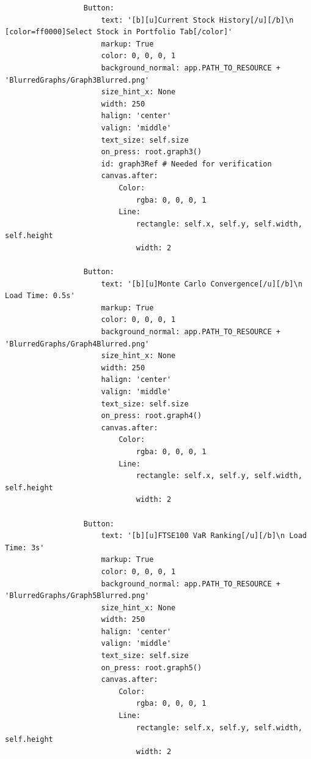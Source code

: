 \documentclass{article}
\begin{document}
\begin{verbatim}
                  Button:
                      text: '[b][u]Current Stock History[/u][/b]\n [color=ff0000]Select Stock in Portfolio Tab[/color]'
                      markup: True
                      color: 0, 0, 0, 1
                      background_normal: app.PATH_TO_RESOURCE + 'BlurredGraphs/Graph3Blurred.png'
                      size_hint_x: None
                      width: 250
                      halign: 'center'
                      valign: 'middle'
                      text_size: self.size
                      on_press: root.graph3()
                      id: graph3Ref # Needed for verification
                      canvas.after:
                          Color:
                              rgba: 0, 0, 0, 1
                          Line:
                              rectangle: self.x, self.y, self.width, self.height
                              width: 2

                  Button:
                      text: '[b][u]Monte Carlo Convergence[/u][/b]\n Load Time: 0.5s'
                      markup: True
                      color: 0, 0, 0, 1
                      background_normal: app.PATH_TO_RESOURCE + 'BlurredGraphs/Graph4Blurred.png'
                      size_hint_x: None
                      width: 250
                      halign: 'center'
                      valign: 'middle'
                      text_size: self.size
                      on_press: root.graph4()
                      canvas.after:
                          Color:
                              rgba: 0, 0, 0, 1
                          Line:
                              rectangle: self.x, self.y, self.width, self.height
                              width: 2

                  Button:
                      text: '[b][u]FTSE100 VaR Ranking[/u][/b]\n Load Time: 3s'
                      markup: True
                      color: 0, 0, 0, 1
                      background_normal: app.PATH_TO_RESOURCE + 'BlurredGraphs/Graph5Blurred.png'
                      size_hint_x: None
                      width: 250
                      halign: 'center'
                      valign: 'middle'
                      text_size: self.size
                      on_press: root.graph5()
                      canvas.after:
                          Color:
                              rgba: 0, 0, 0, 1
                          Line:
                              rectangle: self.x, self.y, self.width, self.height
                              width: 2


\end{verbatim}
\end{document}
